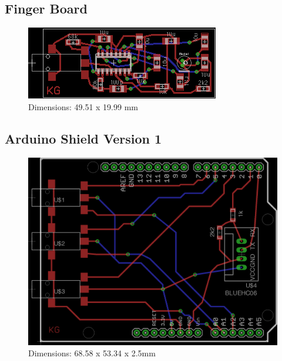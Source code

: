\subsection{Finger Board}
\label{fingerboardpcb}
\begin{figure}[H]
\centering
\includegraphics[scale = 2]{Images/mic_pcb_02}
\\ Dimensions: 49.51 x 19.99 mm
\end{figure}

\subsection{Arduino Shield Version 1}
\label{ardshieldpcb}
\begin{figure}[H]
\centering
\includegraphics[scale = 1.5]{Images/ard_pcb_01}
\\ Dimensions: 68.58 x 53.34 x 2.5mm
\end{figure}


